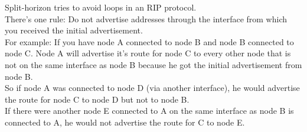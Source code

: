 Split-horizon tries to avoid loops in an RIP protocol. \\
There's one rule: Do not advertise addresses through the interface from which you received the initial advertisement. \\
For example: If you have node A connected to node B and node B connected to node C. Node A will advertise it's route for node C to every other node that is not on the same interface as node B because he got the initial advertisement from node B. \\
So if node A was connected to node D (via another interface), he would advertise the route for node C to node D but not to node B. \\
If there were another node E connected to A on the same interface as node B is connected to A, he would not advertise the route for C to node E.